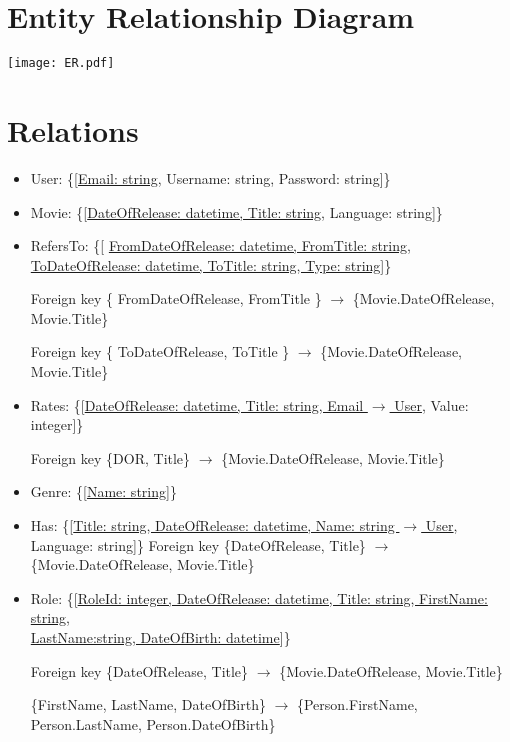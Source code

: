 \section{Entity Relationship Diagram}

\texttt{[image: ER.pdf]}

\section{Relations}
\begin{itemize}
\item User: \{[\underline{Email: string}, Username: string, Password: string]\}

\item Movie: \{[\underline{DateOfRelease: datetime, Title: string}, Language: string]\}

\item RefersTo: \{[ \underline{FromDateOfRelease: datetime, FromTitle: string,}\\ \underline{ToDateOfRelease: datetime, ToTitle: string, Type: string}]\}

	Foreign key \{ FromDateOfRelease, FromTitle \} $ \rightarrow $ \{Movie.DateOfRelease, Movie.Title\}
	
	Foreign key \{ ToDateOfRelease, ToTitle \} $ \rightarrow $ \{Movie.DateOfRelease, Movie.Title\}

\item Rates: \{[\underline{DateOfRelease: datetime, Title: string, Email $ \rightarrow $ User}, Value: integer]\}

Foreign key \{DOR, Title\}  $ \rightarrow $ \{Movie.DateOfRelease, Movie.Title\}

\item Genre: \{[\underline{Name: string}]\}

\item Has: \{[\underline{Title: string, DateOfRelease: datetime, Name: string $ \rightarrow $ User}, Language: string]\}
	Foreign key \{DateOfRelease, Title\} $ \rightarrow $ \{Movie.DateOfRelease, Movie.Title\}

\item Role: \{[\underline{RoleId: integer, DateOfRelease: datetime, Title: string, FirstName: string},\\ \underline{LastName:string, DateOfBirth: datetime}]\}

Foreign key \{DateOfRelease, Title\} $ \rightarrow $ \{Movie.DateOfRelease, Movie.Title\}

\{FirstName, LastName, DateOfBirth\} $ \rightarrow $ \{Person.FirstName, Person.LastName, Person.DateOfBirth\}


\end{itemize}
